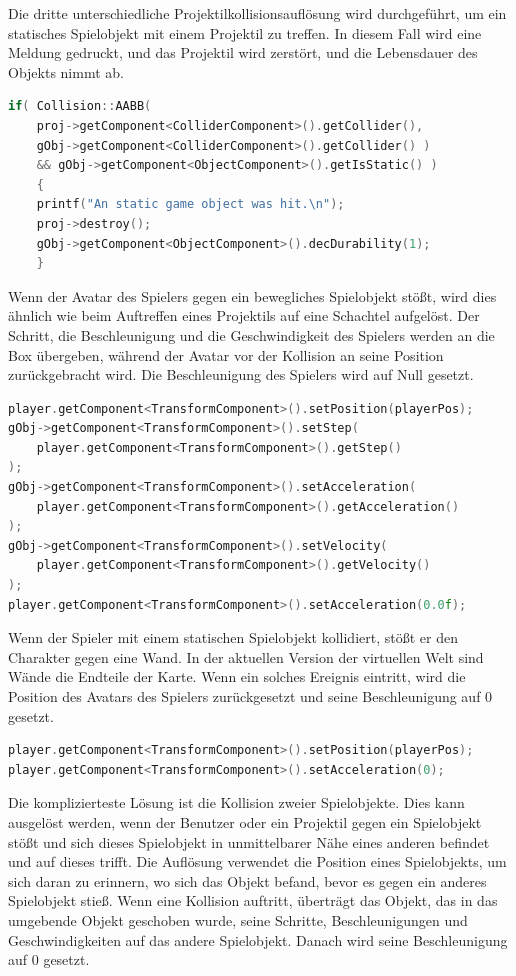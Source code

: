 \documentclass[
  10pt,
  a4paper,
  oneside,
  headers,
  headinclude,
  footinclude,
  BCOR5mm,
]{article}
\begin{document}
Die dritte unterschiedliche Projektilkollisionsauflösung wird durchgeführt, um
ein statisches Spielobjekt mit einem Projektil zu treffen. In diesem Fall wird
eine Meldung gedruckt, und das Projektil wird zerstört, und die Lebensdauer des
Objekts nimmt ab.

\begin{lstlisting}[language=C++]
  if( Collision::AABB(
    proj->getComponent<ColliderComponent>().getCollider(),
    gObj->getComponent<ColliderComponent>().getCollider() )
    && gObj->getComponent<ObjectComponent>().getIsStatic() )
    {
	printf("An static game object was hit.\n");
	proj->destroy();
	gObj->getComponent<ObjectComponent>().decDurability(1);
    }
\end{lstlisting}

Wenn der Avatar des Spielers gegen ein bewegliches Spielobjekt stößt, wird dies
ähnlich wie beim Auftreffen eines Projektils auf eine Schachtel aufgelöst. Der
Schritt, die Beschleunigung und die Geschwindigkeit des Spielers werden an die
Box übergeben, während der Avatar vor der Kollision an seine Position
zurückgebracht wird. Die Beschleunigung des Spielers wird auf Null gesetzt.

\begin{lstlisting}[language=C++]
player.getComponent<TransformComponent>().setPosition(playerPos);
gObj->getComponent<TransformComponent>().setStep(
    player.getComponent<TransformComponent>().getStep()
);
gObj->getComponent<TransformComponent>().setAcceleration(
    player.getComponent<TransformComponent>().getAcceleration()
);
gObj->getComponent<TransformComponent>().setVelocity(
    player.getComponent<TransformComponent>().getVelocity()
);
player.getComponent<TransformComponent>().setAcceleration(0.0f);
\end{lstlisting}

Wenn der Spieler mit einem statischen Spielobjekt kollidiert, stößt er den
Charakter gegen eine Wand. In der aktuellen Version der virtuellen Welt sind
Wände die Endteile der Karte. Wenn ein solches Ereignis eintritt, wird die
Position des Avatars des Spielers zurückgesetzt und seine Beschleunigung auf 0
gesetzt.

\begin{lstlisting}[language=C++]
player.getComponent<TransformComponent>().setPosition(playerPos);
player.getComponent<TransformComponent>().setAcceleration(0);
\end{lstlisting}

Die komplizierteste Lösung ist die Kollision zweier Spielobjekte. Dies kann
ausgelöst werden, wenn der Benutzer oder ein Projektil gegen ein Spielobjekt
stößt und sich dieses Spielobjekt in unmittelbarer Nähe eines anderen befindet
und auf dieses trifft. Die Auflösung verwendet die Position eines Spielobjekts,
um sich daran zu erinnern, wo sich das Objekt befand, bevor es gegen ein anderes
Spielobjekt stieß. Wenn eine Kollision auftritt, überträgt das Objekt, das in
das umgebende Objekt geschoben wurde, seine Schritte, Beschleunigungen und
Geschwindigkeiten auf das andere Spielobjekt. Danach wird seine Beschleunigung
auf 0 gesetzt.
\end{document}
